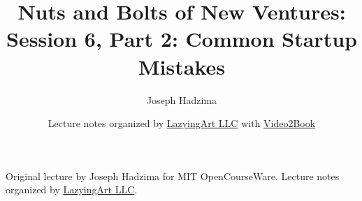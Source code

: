 \documentclass[11pt,oneside]{book}
\begin{document}
\frontmatter
\title{Nuts and Bolts of New Ventures: Session 6, Part 2: Common Startup Mistakes}
\author{Joseph Hadzima}
\date{Lecture notes organized by \href{https://lazying.art}{LazyingArt LLC} with \href{https://github.com/lachlanchen/Video2Book}{Video2Book}}
\maketitle
\begin{center}
\small Original lecture by Joseph Hadzima for MIT OpenCourseWare. Lecture notes organized by \href{https://lazying.art}{LazyingArt LLC}.
\end{center}
\clearpage
\mainmatter

\end{document}
